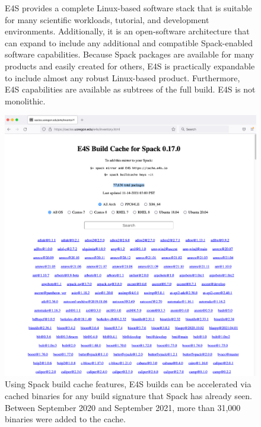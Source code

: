 \begin{figure}
	\centering
	\caption{E4S provides a complete Linux-based software stack that is suitable for many scientific workloads, tutorial, and development environments.  Additionally, it is an open-software architecture that can expand to include any additional and compatible Spack-enabled software capabilities. Because Spack packages are available for many products and easily created for others, E4S is practically expandable to include almost any robust Linux-based product.  Furthermore, E4S capabilities are available as subtrees of the full build. E4S is not monolithic.}
    \protect{}
	\label{fig:e4s-is-isnot}
\end{figure}

\begin{figure}
	\centering
	\includegraphics[width=0.9\linewidth]{projects/2.3.5-Ecosystem/2.3.5.01-Ecosystem-SDK/E4S_buildcache_Feb22}
	\caption{Using Spack build cache features, E4S builds can be accelerated via cached binaries for any build signature that Spack has already seen. Between September 2020 and September 2021, more than 31,000 binaries were added to the cache.}
	\label{fig:e4s-build-cache}
\end{figure}

